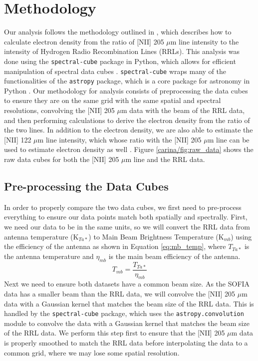\section{Methodology}
Our analysis follows the methodology outlined in \cite{pineda2019electron}, which describes how to calculate electron density from the ratio of [NII] 205 $\mu$m line intensity to the intensity of Hydrogen Radio Recombination Lines (RRLs).
This analysis was done using the \texttt{spectral-cube} package in Python, which allows for efficient manipulation of spectral data cubes \parencite{robitaille2016spectral}.
\texttt{spectral-cube} wraps many of the functionalities of the \texttt{astropy} package, which is a core package for astronomy in Python \parencite{astropy:2013, astropy:2018, astropy:2022}.
Our methodology for analysis consists of preprocessing the data cubes to ensure they are on the same grid with the same spatial and spectral resolutions, convolving the [NII] 205 $\mu$m data with the beam of the RRL data, and then performing calculations to derive the electron density from the ratio of the two lines.
In addition to the electron density, we are also able to estimate the [NII] 122 $\mu$m line intensity, which whose ratio with the [NII] 205 $\mu$m line can be used to estimate electron density as well \parencite{goldsmith2015herschel}.
Figure \ref{carina/fig:raw_data} shows the raw data cubes for both the [NII] 205 $\mu$m line and the RRL data.

\subsection{Pre-processing the Data Cubes}
In order to properly compare the two data cubes, we first need to pre-process everything to ensure our data points match both spatially and spectrally.
First, we need our data to be in the same units, so we will convert the RRL data from antenna temperature (K$_{Ta*}$) to Main Beam Brightness Temperature (K$_{mb}$) using the efficiency of the antenna as shown in Equation \ref{eq:mb_temp}, where $T_{Ta*}$ is the antenna temperature and $\eta_{mb}$ is the main beam efficiency of the antenna.
\begin{equation}
    T_{mb} = \frac{T_{Ta*}}{\eta_{mb}}
    \label{eq:mb_temp}
\end{equation}
Next we need to ensure both datasets have a common beam size.
As the SOFIA data has a smaller beam than the RRL data, we will convolve the [NII] 205 $\mu$m data with a Gaussian kernel that matches the beam size of the RRL data.
This is handled by the \texttt{spectral-cube} package, which uses the \texttt{astropy.convolution} module to convolve the data with a Gaussian kernel that matches the beam size of the RRL data.
We perform this step first to ensure that the [NII] 205 $\mu$m data is properly smoothed to match the RRL data before interpolating the data to a common grid, where we may lose some spatial resolution. 


